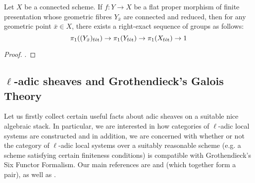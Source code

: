         \begin{proposition} \label{prop: etale_homotopy_exact_sequence}
            Let $X$ be a connected scheme. If $f: Y \to X$ be a flat proper morphism of finite presentation whose geometric fibres $Y_{\bar{x}}$ are connected and reduced, then for any geometric point $\bar{x} \in X$, there exists a right-exact sequence of groups as follows:
                $$\pi_1((Y_{\bar{x}})_{\mathrm{f\acute{e}t}}) \to \pi_1(Y_{\mathrm{f\acute{e}t}}) \to \pi_1(X_{\mathrm{f\acute{e}t}}) \to 1$$
        \end{proposition}
            \begin{proof}
                \cite[\href{https://stacks.math.columbia.edu/tag/0C0J}{Tag 0C0J}]{stacks}.
            \end{proof}
    
    \subsection{\texorpdfstring{$\ell$}{}-adic sheaves and Grothendieck's Galois Theory}
        Let us firstly collect certain useful facts about adic sheaves on a suitable nice algebraic stack. In particular, we are interested in how categories of $\ell$-adic local systems are constructed and in addition, we are concerned with whether or not the category of $\ell$-adic local systems over a suitably reasonable scheme (e.g. a scheme satisfying certain finiteness conditions) is compatible with Grothendieck's Six Functor Formalism. Our main references are \cite{freitag_kiehl_etale_cohomology} and \cite{kiehl_weissauer_weil_conjecture_perverse_sheaves_and_l_adic_fourier_transform} (which together form a pair), as well as \cite{conrad_etale_cohomology}.
    
